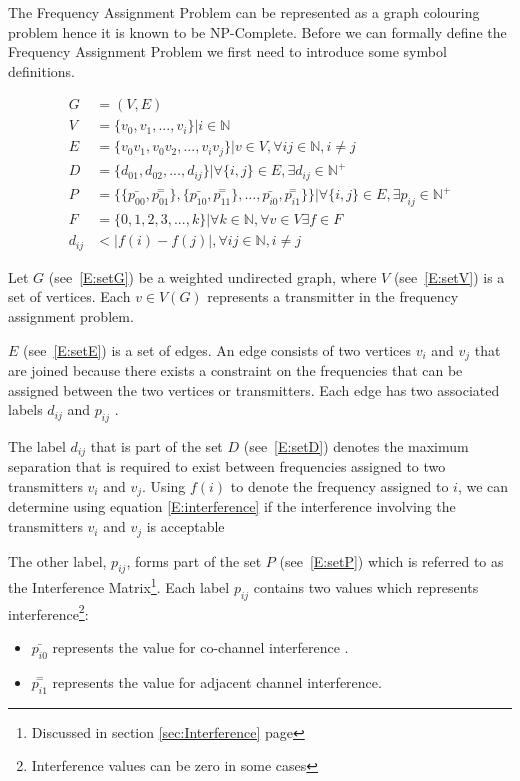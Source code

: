 The Frequency Assignment Problem can be represented as a graph colouring problem hence it is known to be NP-Complete. Before we can formally define the Frequency Assignment Problem we first need to introduce some symbol definitions.

\begin{align}
	G &= (V,E) \label{E:setG}\\
	V &= \{v_{0},v_{1},...,v_{i}\} | i \in \mathbb{N} \label{E:setV}\\
	E &= \{v_0v_1,v_0v_2,...,v_iv_j\}|v \in V,\forall ij \in \mathbb{N},i \neq j \label{E:setE}\\
	D &= \{d_{01},d_{02},...,d_{ij}\}| \forall\{i,j\} \in E, \exists d_{ij} \in \mathbb{N}^+ \label{E:setD}\\
	P &= \{\{\bar{p_{00}},\overset{=}{p_{01}}\},\{\bar{p_{10}},\overset{=}{p_{11}}\},\ldots,\bar{p_{i0}},\overset{=}{p_{i1}}\}\}| \forall \{i,j\} \in E,\exists p_{ij} \in \mathbb{N}^+ \label{E:setP}\\
	F &= \{0,1,2,3,...,k\}| \forall k \in \mathbb{N},\forall v \in V \exists f \in F\label{E:setF}\\
	d_{ij} &< |f(i) - f(j)|, \forall ij \in \mathbb{N},i \neq j \label{E:interference}
\end{align}

Let $G$ (see~\ref{E:setG}) be a weighted undirected graph, where $V$ (see~\ref{E:setV}) is a set of vertices. Each $v \in V(G)$ represents a transmitter in the frequency assignment problem. 

$E$ (see~\ref{E:setE}) is a set of edges. An edge consists of two vertices $v_i$ and $v_j$ that are joined because there exists a constraint on the frequencies that can be assigned between the two vertices or transmitters. Each edge has two associated labels $d_{ij}$ and $p_{ij}$ \cite{FAPOrientationModel,TabuMontemanniSmith}. 

The label $d_{ij}$ that is part of the set $D$ (see~\ref{E:setD}) denotes the maximum separation that is required to exist between frequencies assigned to two transmitters $v_i$ and $v_j$. Using $f(i)$ to denote the frequency assigned to $i$, we can determine using equation \ref{E:interference} if the interference involving the transmitters $v_i$ and $v_j$ is acceptable\cite{FAPOrientationModel,TabuMontemanniSmith}

The other label, $p_{ij}$, forms part of the set $P$ (see~\ref{E:setP}) which is referred to as the Interference Matrix\footnote{Discussed in section \ref{sec:Interference} page \pageref{sec:Interference}}. Each label $p_{ij}$ contains two values which represents interference\footnote{Interference values can be zero in some cases}:
\begin{itemize}
\item $\bar{p_{i0}}$ represents the value for co-channel interference \cite{FAPOrientationModel,TabuMontemanniSmith}. 
\item $\overset{=}{p_{i1}}$ represents the value for adjacent channel interference\cite{FAPOrientationModel,TabuMontemanniSmith}.
\end{itemize}

